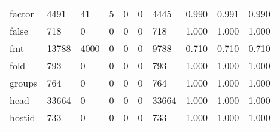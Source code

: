 \begin{longtable}{lp{2.0cm}p{2.0cm}p{2.0cm}p{2.0cm}p{2.0cm}p{2.0cm}p{2.0cm}p{2.0cm}p{2.0cm}}
factor    &                   4491 &                                 41 &                                 5 &                                0 &                                 0 &                            4445 &                                0.990 &                                  0.991 &                                0.990 \\
false     &                    718 &                                  0 &                                 0 &                                0 &                                 0 &                             718 &                                1.000 &                                  1.000 &                                1.000 \\
fmt       &                  13788 &                               4000 &                                 0 &                                0 &                                 0 &                            9788 &                                0.710 &                                  0.710 &                                0.710 \\
fold      &                    793 &                                  0 &                                 0 &                                0 &                                 0 &                             793 &                                1.000 &                                  1.000 &                                1.000 \\
groups    &                    764 &                                  0 &                                 0 &                                0 &                                 0 &                             764 &                                1.000 &                                  1.000 &                                1.000 \\
head      &                  33664 &                                  0 &                                 0 &                                0 &                                 0 &                           33664 &                                1.000 &                                  1.000 &                                1.000 \\
hostid    &                    733 &                                  0 &                                 0 &                                0 &                                 0 &                             733 &                                1.000 &                                  1.000 &                                1.000 \\

\end{longtable}
